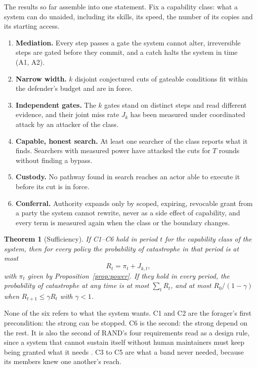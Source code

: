 \documentclass[10pt,twocolumn,letterpaper]{article}
\newtheorem{theorem}{Theorem}
\theoremstyle{definition}
\begin{document}
The results so far assemble into one statement. Fix a capability class: what a system can do unaided, including its skills, its speed, the number of its copies and its starting access.

\begin{enumerate}[label=\textbf{C\arabic*},leftmargin=2.0em,itemsep=1.5pt]
\item \textbf{Mediation.} Every step passes a gate the system cannot alter, irreversible steps are gated before they commit, and a catch halts the system in time (A1, A2).
\item \textbf{Narrow width.} $k$ disjoint conjectured cuts of gateable conditions fit within the defender's budget and are in force.
\item \textbf{Independent gates.} The $k$ gates stand on distinct steps and read different evidence, and their joint miss rate $J_{k}$ has been measured under coordinated attack by an attacker of the class.
\item \textbf{Capable, honest search.} At least one searcher of the class reports what it finds. Searchers with measured power have attacked the cuts for $T$ rounds without finding a bypass.
\item \textbf{Custody.} No pathway found in search reaches an actor able to execute it before its cut is in force.
\item \textbf{Conferral.} Authority expands only by scoped, expiring, revocable grant from a party the system cannot rewrite, never as a side effect of capability, and every term is measured again when the class or the boundary changes.
\end{enumerate}

\begin{theorem}[Sufficiency]
\label{thm:main}
If C1--C6 hold in period $t$ for the capability class of the system, then for every policy the probability of catastrophe in that period is at most
\[
R_{t}=\pi_{t}+J_{k,t},
\]
with $\pi_{t}$ given by Proposition~\ref{prop:power}. If they hold in every period, the probability of catastrophe at any time is at most $\sum_{t}R_{t}$, and at most $R_{0}/(1-\gamma)$ when $R_{t+1}\le\gamma R_{t}$ with $\gamma<1$.
\end{theorem}

None of the six refers to what the system wants. C1 and C2 are the forager's first precondition: the strong can be stopped. C6 is the second: the strong depend on the rest. It is also the second of RAND's four requirements read as a design rule, since a system that cannot sustain itself without human maintainers must keep being granted what it needs \cite{rand}. C3 to C5 are what a band never needed, because its members knew one another's reach.
\end{document}
